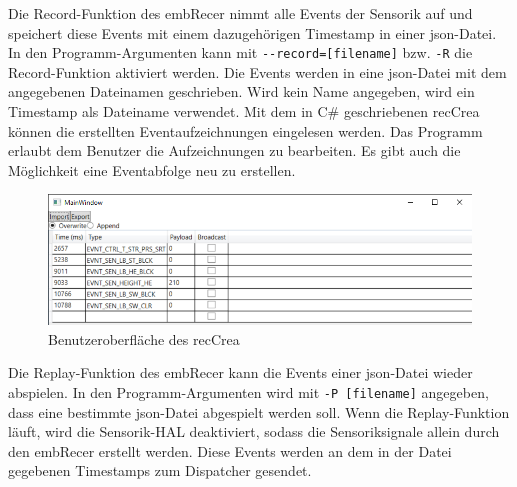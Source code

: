 Die Record-Funktion des \gls{embRecer} nimmt alle Events der Sensorik auf und
speichert diese Events mit einem dazugehörigen Timestamp in einer json-Datei.
In den Programm-Argumenten kann mit \verb|--record=[filename]| bzw.
\verb|-R| die Record-Funktion aktiviert werden.
Die Events werden in eine json-Datei mit dem angegebenen Dateinamen geschrieben.
Wird kein Name angegeben, wird ein Timestamp als Dateiname verwendet.
Mit dem in C\# geschriebenen \gls{recCrea} können die erstellten
Eventaufzeichnungen eingelesen werden.
Das Programm erlaubt dem Benutzer die Aufzeichnungen zu bearbeiten.
Es gibt auch die Möglichkeit eine Eventabfolge neu zu erstellen.
\begin{figure}[h]
    \centering
    \includegraphics[scale = 0.7]{anhang/EmbeddedRecordCreator.PNG}
    \caption{Benutzeroberfläche des \gls{recCrea}}
    \label{fig:embedded-record-creator}
\end{figure}

\FloatBarrier
\noindent Die Replay-Funktion des \gls{embRecer} kann die Events einer json-Datei wieder
abspielen.
In den Programm-Argumenten wird mit \verb|-P [filename]| angegeben, dass eine bestimmte json-Datei
abgespielt werden soll.
Wenn die Replay-Funktion läuft, wird die Sensorik-HAL deaktiviert,
sodass die Sensoriksignale allein durch den \gls{embRecer} erstellt werden.
Diese Events werden an dem in der Datei gegebenen Timestamps zum Dispatcher gesendet.
